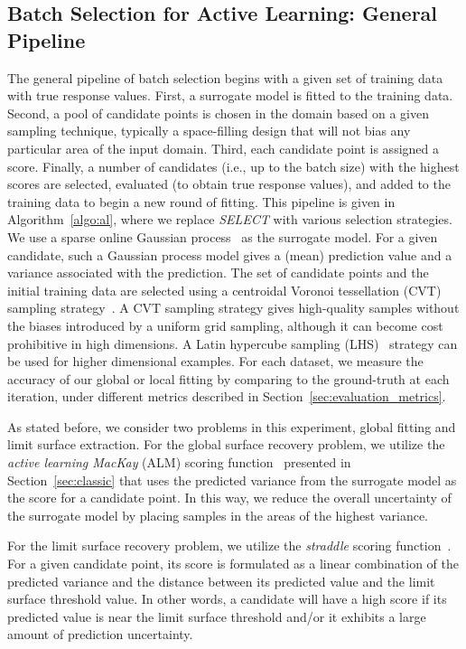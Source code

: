 \subsection{Batch Selection for Active Learning: General Pipeline}
The general pipeline of batch selection begins with a given set of training data with true response values.
%
First, a surrogate model is fitted to the training data.
%
Second, a pool of candidate points is chosen in the domain based on a given sampling technique, typically a space-filling design that will not bias any particular area of the input domain.
%
Third, each candidate point is assigned a score.
%
Finally, a number of candidates (i.e., up to the batch size) with the highest scores are selected, evaluated (to obtain true response values), and added to the training data to begin a new round of fitting.
%
This pipeline is given in Algorithm~\ref{algo:al}, where we replace \textit{SELECT} with various selection strategies.
%
We use a sparse online Gaussian process~\cite{CsatoOpper2002} as the surrogate model.
%
For a given candidate, such a Gaussian process model gives a (mean) prediction value and a variance associated with the prediction.
%
The set of candidate points and the initial training data are selected using a centroidal Voronoi tessellation (CVT) sampling strategy~\cite{DuFaberGunzburger1999}.
%
A CVT sampling strategy gives high-quality samples without the biases introduced by a uniform grid sampling, although it can become cost prohibitive in high dimensions.
%
A Latin hypercube sampling (LHS)~\cite{ImanDavenportZeigler1980} strategy can be used for higher dimensional examples.
%
For each dataset, we measure the accuracy of our global or local fitting by comparing to the ground-truth at each iteration, under different metrics described in Section~\ref{sec:evaluation_metrics}.

As stated before, we consider two problems in this experiment, global fitting and limit surface extraction.
%
For the global surface recovery problem, we utilize the \emph{active learning MacKay} (ALM) scoring function~\cite{MacKay1992} presented in Section~\ref{sec:classic} that uses the predicted variance from the surrogate model as the score for a candidate point.
%
In this way, we reduce the overall uncertainty of the surrogate model by placing samples in the areas of the highest variance.

For the limit surface recovery problem, we utilize the \emph{straddle} scoring function~\cite{BryanSchneiderNichol2005}.
%
For a given candidate point, its score is formulated as a linear combination of the predicted variance and the distance between its predicted value and the limit surface threshold value.
%
In other words, a candidate will have a high score if its predicted value is near the limit surface threshold and/or it exhibits a large amount of prediction uncertainty.

